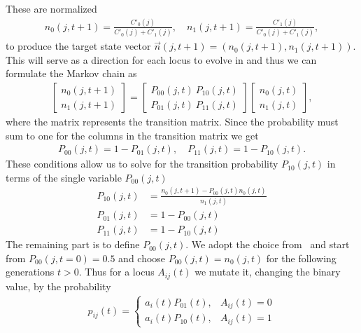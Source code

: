 These are normalized
\begin{align}
  n_0(j, t+1) = \frac{C'_0(j)}{C'_0(j) + C'_1(j)}, \quad n_1(j, t+1) = \frac{C'_1(j)}{C'_0(j) + C'_1(j)},
  \label{eq:target_states}
\end{align}
to produce the target state vector $\vec{n}(j,t+1)=(n_0(j, t+1), n_1(j, t+1))$.  This will serve as a direction for each locus to evolve in and thus we can formulate the Markov chain as
\begin{align*}
  \begin{bmatrix}
    n_0(j, t+1) \\
    n_1(j, t+1)
  \end{bmatrix}
  = 
  \begin{bmatrix}
    P_{00}(j,t) \ P_{10}(j,t) \\
    P_{01}(j,t) \ P_{11}(j,t)
  \end{bmatrix}
  \begin{bmatrix}
    n_0(j, t) \\
    n_1(j, t)
  \end{bmatrix},
\end{align*}
where the matrix represents the transition matrix. Since the probability must sum to one for the columns in the transition matrix we get 
\begin{align*}
  P_{00}(j, t) = 1 - P_{01}(j, t), \quad P_{11}(j, t) = 1 - P_{10}(j, t).
\end{align*}
These conditions allow us to solve for the transition probability $P_{10}(j,t)$ in terms of the single variable $P_{00}(j,t)$
\begin{align}
  P_{10}(j,t) &= \frac{n_0(j, t+1) - P_{00}(j,t)n_0(j, t)}{n_1(j,t)}  \label{eq:trans_prop_p10}\\
  P_{01}(j,t) &= 1 - P_{00}(j,t) \label{eq:trans_prop_p01} \\
  P_{11}(j,t) &= 1 - P_{10}(j,t) \label{eq:trans_prop_p11}
\end{align}
The remaining part is to define $P_{00}(j,t)$. We adopt the choice from~\cite{Wang2010} and start from $P_{00}(j, t = 0) = 0.5$ and choose $P_{00}(j,t) = n_0(j,t)$ for the following generations $t>0$. Thus for a locus $A_{ij}(t)$ we mutate it, changing the binary value, by the probability
\begin{align}
  p_{ij}(t) = 
  \begin{cases}
    a_i(t)P_{01}(t), &A_{ij}(t) = 0 \\
    a_i(t)P_{10}(t), &A_{ij}(t) = 1
  \end{cases}
  \label{eq:p_flip}
\end{align}
